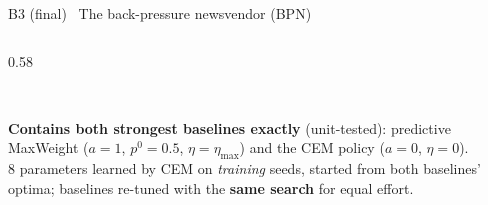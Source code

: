 \documentclass[aspectratio=169,10pt,xcolor={table,dvipsnames}]{beamer}
\begin{document}
\begin{frame}{B3 (final) \textbullet\ The back-pressure newsvendor (BPN)}
\begin{columns}[T]
\begin{column}{0.58\textwidth}
\\[3pt]
\begin{tcolorbox}[enhanced,colback=gold!12,colframe=gold!80!black,boxrule=0.5pt,arc=2pt,left=4pt,right=4pt]
\footnotesize\textbf{Contains both strongest baselines exactly} (unit-tested): predictive MaxWeight ($a{=}1$, $p^0{=}0.5$, $\eta{=}\eta_{\max}$) and the CEM policy ($a{=}0$, $\eta{=}0$).\\
8 parameters learned by CEM on \emph{training} seeds, started from both baselines' optima; baselines re-tuned with the \textbf{same search} for equal effort.
\end{tcolorbox}
\end{column}
\end{columns}
\end{frame}
\end{document}
